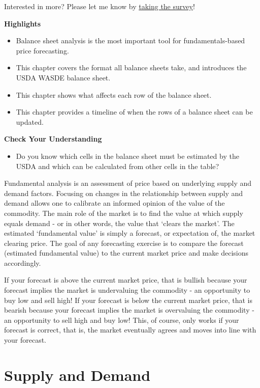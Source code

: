 \documentclass[
  letterpaper,
  DIV=11,
  numbers=noendperiod]{scrreprt}
\providecommand{\tightlist}{%
  \setlength{\itemsep}{0pt}\setlength{\parskip}{0pt}}\usepackage{longtable,booktabs,array}
\begin{document}
{Interested in more? Please let me know by}
\href{https://forms.gle/Q3VByCQZHjfQSy9D7}{taking the survey}!

\textbf{Highlights}

\begin{itemize}
\tightlist
\item
  Balance sheet analysis is the most important tool for
  fundamentals-based price forecasting.
\item
  This chapter covers the format all balance sheets take, and introduces
  the USDA WASDE balance sheet.
\item
  This chapter shows what affects each row of the balance sheet.
\item
  This chapter provides a timeline of when the rows of a balance sheet
  can be updated.
\end{itemize}

\textbf{Check Your Understanding}

\begin{itemize}
\tightlist
\item
  Do you know which cells in the balance sheet must be estimated by the
  USDA and which can be calculated from other cells in the table?
\end{itemize}

Fundamental analysis is an assessment of price based on underlying
supply and demand factors. Focusing on changes in the relationship
between supply and demand allows one to calibrate an informed opinion of
the value of the commodity. The main role of the market is to find the
value at which supply equals demand - or in other words, the value that
`clears the market'. The estimated `fundamental value' is simply a
forecast, or expectation of, the market clearing price. The goal of any
forecasting exercise is to compare the forecast (estimated fundamental
value) to the current market price and make decisions accordingly.

If your forecast is above the current market price, that is bullish
because your forecast implies the market is undervaluing the commodity -
an opportunity to buy low and sell high! If your forecast is below the
current market price, that is bearish because your forecast implies the
market is overvaluing the commodity - an opportunity to sell high and
buy low! This, of course, only works if your forecast is correct, that
is, the market eventually agrees and moves into line with your forecast.

\hypertarget{supply-and-demand}{%
\section{Supply and Demand}\label{supply-and-demand}}
\end{document}
